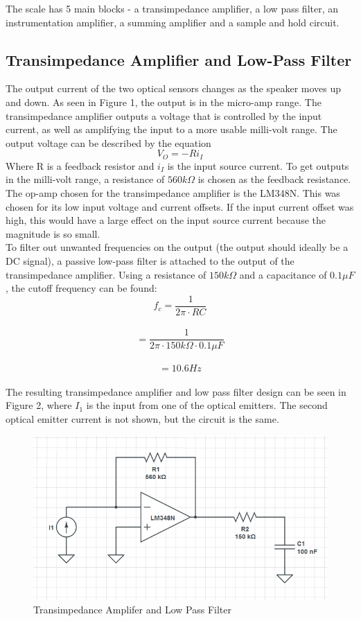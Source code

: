 \documentclass[12pt]{article}
\begin{document}
	The scale has 5 main blocks - a transimpedance amplifier, a low pass filter, an instrumentation amplifier, a summing amplifier and a sample and hold circuit.
	
	\subsection{Transimpedance Amplifier and Low-Pass Filter}
	
	The output current of the two optical sensors changes as the speaker moves up and down. As seen in Figure 1, the output is in the micro-amp range. The transimpedance amplifier outputs a voltage that is controlled by the input current, as well as amplifying the input to a more usable milli-volt range. The output voltage can be described by the equation
	$$ V_{O} = -Ri_{I}$$
	Where R is a feedback resistor and $i_{I}$ is the input source current. To get outputs in the milli-volt range, a resistance of $560k\Omega$ is chosen as the feedback resistance. \\
	
	The op-amp chosen for the transimpedance amplifier is the LM348N. This was chosen for its low input voltage and current offsets. If the input current offset was high, this would have a large effect on the input source current because the magnitude is so small. \\
	
	To filter out unwanted frequencies on the output (the output should ideally be a DC signal), a passive low-pass filter is attached to the output of the transimpedance amplifier. Using a resistance of $150k\Omega$ and a capacitance of $0.1\mu F$, the cutoff frequency can be found:
	$$f_{c} = \frac{1}{2\pi\cdot RC}$$ \\
	$$ = \frac{1}{2\pi\cdot 150k\Omega\cdot0.1\mu F} $$ \\
	$$ = 10.6 Hz$$ \\
	The resulting transimpedance amplifier and low pass filter design can be seen in Figure 2, where $I_{1}$ is the input from one of the optical emitters. The second optical emitter current is not shown, but the circuit is the same.
	\begin{figure}[h]
		\centering
		\includegraphics[width=\columnwidth]{transimpedance_lpf}
		\caption{Transimpedance Amplifer and Low Pass Filter}
	\end{figure}
	
\end{document}
